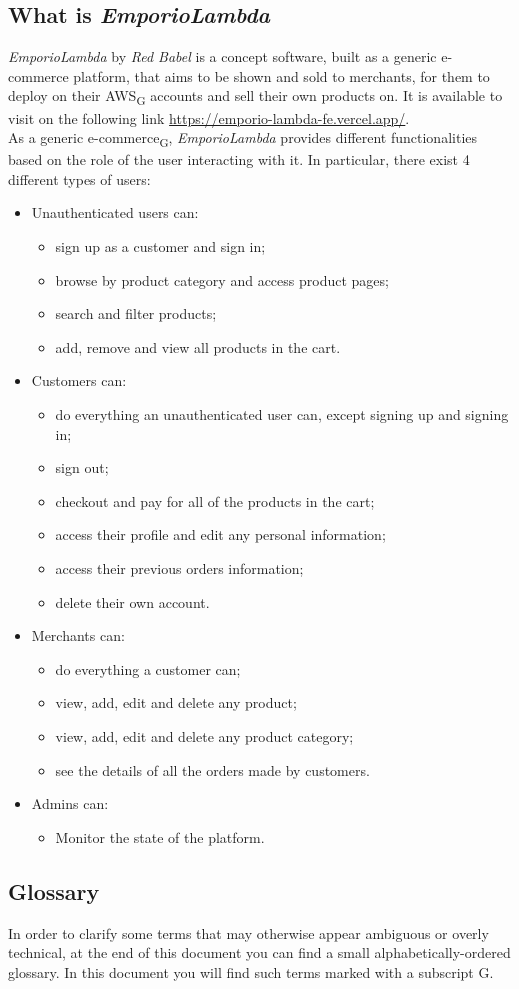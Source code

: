 \subsection{What is \textit{EmporioLambda}}
\textit{EmporioLambda} by \textit{Red Babel} is a concept software, built as a generic e-commerce platform, that aims to be shown and sold to merchants, for them to deploy on their AWS\textsubscript{G} accounts and sell their own products on. It is available to visit on the following link \url{https://emporio-lambda-fe.vercel.app/}.\\
As a generic e-commerce\textsubscript{G}, \textit{EmporioLambda} provides different functionalities based on the role of the user interacting with it. In particular, there exist 4 different types of users:
\begin{itemize}
\item Unauthenticated users can:
\begin{itemize}
\item sign up as a customer and sign in;
\item browse by product category and access product pages;
\item search and filter products;
\item add, remove and view all products in the cart.
\end{itemize}
\item Customers can:
\begin{itemize}
\item do everything an unauthenticated user can, except signing up and signing in;
\item sign out;
\item checkout and pay for all of the products in the cart;
\item access their profile and edit any personal information;
\item access their previous orders information;
\item delete their own account.
\end{itemize}
\item Merchants can:
\begin{itemize}
\item do everything a customer can;
\item view, add, edit and delete any product;
\item view, add, edit and delete any product category;
\item see the details of all the orders made by customers.
\end{itemize}
\item Admins can:
\begin{itemize}
\item Monitor the state of the platform.
\end{itemize}
\end{itemize}
\subsection{Glossary}
In order to clarify some terms that may otherwise appear ambiguous or overly technical, at the end of this document you can find a small alphabetically-ordered glossary. In this document you will find such terms marked with a subscript G.
